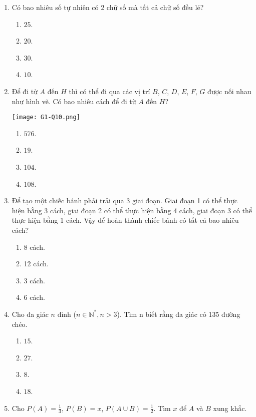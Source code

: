 \begin{enumerate}[label=\textbf{Câu \arabic*.},align=left,left=0cm..0cm,itemindent=*]
\begin{enumerate}[label=\textbf{\Alph*.},align=left,left=1cm..0cm,itemindent=*]
	\end{enumerate}
	\item Có bao nhiêu số tự nhiên có 2 chữ số mà tất cả chữ số đều lẻ?
	\begin{enumerate}[label=\textbf{\Alph*.},align=left,left=1cm..0cm,itemindent=*]
		\item $25$. \item $20$. \item $30$. \item $10$.
	\end{enumerate}
	\item Để đi từ $A$ đến $H$ thì có thể đi qua các vị trí $B$, $C$, $D$, $E$, $F$, $G$ được nối nhau như hình vẽ. Có bao nhiêu cách để đi từ $A$ đến $H$?\par
	{\centering\texttt{[image: G1-Q10.png]}\par}
	\begin{enumerate}[label=\textbf{\Alph*.},align=left,left=1cm..0cm,itemindent=*]
		\item $576$. \item $19$. \item $104$. \item $108$.
	\end{enumerate}
	\item Để tạo một chiếc bánh phải trải qua 3 giai đoạn. Giai đoạn 1 có thể thực hiện bằng 3 cách, giai đoạn 2 có thể thực hiện bằng 4 cách, giai đoạn 3 có thể thực hiện bằng 1 cách. Vậy để hoàn thành chiếc bánh có tất cả bao nhiêu cách?
	\begin{enumerate}[label=\textbf{\Alph*.},align=left,left=1cm..0cm,itemindent=*]
		\item 8 cách. \item 12 cách. \item 3 cách. \item 6 cách.
	\end{enumerate}
	\item Cho đa giác $n$ đỉnh ($n\in \mathbb{N}^{*},n>3$). Tìm n biết rằng đa giác có 135 đường chéo.
	\begin{enumerate}[label=\textbf{\Alph*.},align=left,left=1cm..0cm,itemindent=*]
		\item $15$. \item $27$. \item $8$. \item $18$.
	\end{enumerate}
	\item Cho $P(A)=\frac 13$, $P(B)=x$, $P(A\cup B)=\frac 12$. Tìm $x$ để $A$ và $B$ xung khắc.

\end{enumerate}
